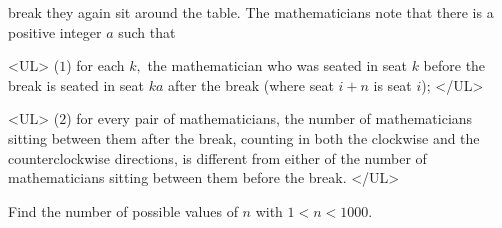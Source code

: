 \documentclass{article}
\begin{document}
\begin{enumerate}[label=\arabic*., itemsep=0.5em]
break they again sit around the table. The mathematicians note that there is a positive integer \(a\) such that

<UL>
(\(1\)) for each \(k,\) the mathematician who was seated in seat \(k\) before the break is seated in seat \(ka\) after the break (where seat \(i + n\) is seat \(i\));
</UL>

<UL>
(\(2\)) for every pair of mathematicians, the number of mathematicians sitting between them after the break, counting in both the clockwise and the counterclockwise directions, is different from either of the number of mathematicians sitting between them before the break.
</UL>

Find the number of possible values of \(n\) with \(1 < n < 1000.\)\par \vspace{0.5em}\end{enumerate}
\end{document}

